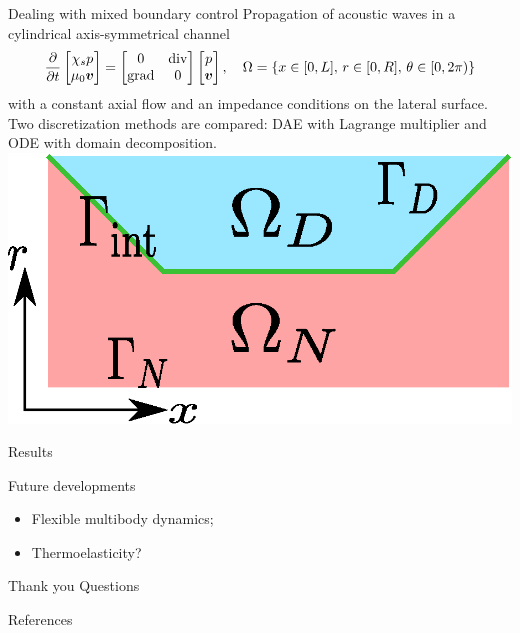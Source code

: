 \documentclass[aspectratio=169]{ISAE-Beamer}
\DeclareMathOperator*{\grad}{grad}
\renewcommand{\div}{\operatorname{div}}
\begin{document}
\begin{frame}{Dealing with mixed boundary control}
Propagation of acoustic waves in a cylindrical axis-symmetrical channel 
\begin{equation*}
\diffp{}{t}
\begin{bmatrix}
\chi_s p \\ \mu_0 \bm{v} \\
\end{bmatrix} = 
\begin{bmatrix}
0 & \div \\ \grad & 0 \\
\end{bmatrix}
\begin{bmatrix}
p \\ \bm{v} \\
\end{bmatrix}, \quad \Omega = \left\{x \in [0, L],\, r \in [0, R],\,  \theta \in [0, 2 \pi) \right\}
\end{equation*}
with a constant axial flow and an impedance conditions on the lateral surface. \\ 
Two discretization methods are compared: DAE with Lagrange multiplier and ODE with domain decomposition.\\

\centering
\includegraphics[height=0.3\textheight]{Vibroacoustic/domain_split.eps}
\end{frame}

\begin{frame}{Results}
\begin{center}
\end{center}
\end{frame}


\begin{frame}{Future developments}
\begin{itemize}
	\item Flexible multibody dynamics;
	\item Thermoelasticity?
\end{itemize}
\end{frame}

\begin{frame}{Thank you}
\centering
\Huge Questions
\end{frame}

\begin{frame}[allowframebreaks]{References}
\printbibliography
\nocite{*}
\end{frame}
\end{document}
